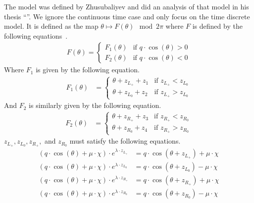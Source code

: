 The model was defined by Zhusubaliyev and  did an analysis of that model in his thesis ``''.
We ignore the continuous time case and only focus on the time discrete model.
It is defined as the map $\theta \mapsto F(\theta) \mod 2 \pi$ where $F$ is defined by the following equations~\cite{akyuz2022}.
\begin{align}
	F(\theta) = \begin{cases}
		            F_1(\theta) & \text{if } q \cdot \cos(\theta) > 0 \\
		            F_2(\theta) & \text{if } q \cdot \cos(\theta) < 0
	            \end{cases}
\end{align}
Where $F_1$ is given by the following equation.
\begin{align}
	F_1(\theta) & = \begin{cases}
		                \theta + z_{L_+} + z_1 & \text{if } z_{L_+} < z_{L_0} \\
		                \theta + z_{L_0} + z_2 & \text{if } z_{L_+} > z_{L_0}
	                \end{cases}
\end{align}
And $F_2$ is similarly given by the following equation.
\begin{align}
	F_2(\theta) & = \begin{cases}
		                \theta + z_{R_+} + z_3 & \text{if } z_{R_+} < z_{R_0} \\
		                \theta + z_{R_0} + z_4 & \text{if } z_{R_+} > z_{R_0}
	                \end{cases}
\end{align}
$z_{L_+}, z_{L_0}, z_{R_+},$ and $z_{R_0}$ must satisfy the following equations.
\begin{subequations}
	\begin{align}
		(q \cdot \cos(\theta) + \mu \cdot \chi) \cdot e^{\lambda \cdot z_{L_+}}
		 & = q \cdot \cos(\theta + z_{L_+}) + \mu \cdot \chi \\
		(q \cdot \cos(\theta) + \mu \cdot \chi) \cdot e^{\lambda \cdot z_{L_0}}
		 & = q \cdot \cos(\theta + z_{L_0}) - \mu \cdot \chi \\
		(q \cdot \cos(\theta) + \mu \cdot \chi) \cdot e^{\lambda \cdot z_{R_+}}
		 & = q \cdot \cos(\theta + z_{R_+}) + \mu \cdot \chi \\
		(q \cdot \cos(\theta) + \mu \cdot \chi) \cdot e^{\lambda \cdot z_{R_0}}
		 & = q \cdot \cos(\theta + z_{R_0}) - \mu \cdot \chi
	\end{align}
\end{subequations}
